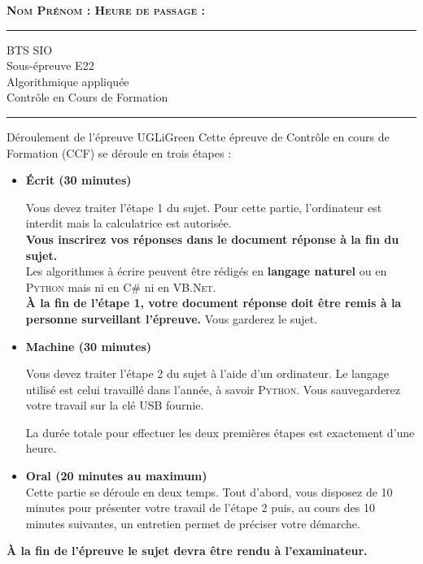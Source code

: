 \renewcommand{\question}{\addtocounter{questionnumber}{1}\subsection*{Question \thequestionnumber}}

{\large\bfseries \scshape Nom Prénom : \makebox[6cm]{\dotfill}\hfill Heure de passage : \makebox[3cm]{\dotfill}\hfill\\
\vspace{2em}
\hrule
\vspace{2mm}
\begin{center}\titlefont\Huge\color{UGLiBlue} BTS SIO\\
	Sous-épreuve E22 \\ 
    Algorithmique appliquée\\
	Contrôle en Cours de Formation\end{center}
\vspace{2mm}
\hrule}
\vspace{2em}

\begin{encadrecolore}{Déroulement de l'épreuve }{UGLiGreen}
	Cette épreuve de Contrôle en cours de Formation (CCF) se déroule en trois étapes :
\begin{itemize}
	\item \textbf{\'Ecrit (30 minutes)}\par
	Vous devez traiter l'étape 1 du sujet. Pour cette partie, l'ordinateur est interdit mais la calculatrice est autorisée.\\
    
    \textbf{Vous inscrirez vos réponses dans le document réponse à la fin du sujet.}\\
    
    Les algorithmes à écrire peuvent être rédigés en \textbf{langage naturel} ou en \textsc{Python}	mais ni en \textsc{C\#} ni en \textsc{VB.Net}.\\
    
    \textbf{À la fin de l'étape 1, votre document réponse doit être remis à la personne surveillant l'épreuve.} Vous garderez le sujet.
    \item \textbf{Machine (30 minutes)}\par
	Vous devez traiter l'étape 2 du sujet à l'aide d'un ordinateur. Le langage utilisé est celui travaillé dans l'année, à savoir \textsc{Python}.
	Vous sauvegarderez votre travail sur la clé USB fournie.\par 
	La durée totale pour effectuer les deux premières étapes est exactement d'une heure. \par
	\item \textbf{Oral (20 minutes au maximum)}\\
	Cette partie se déroule en deux temps. Tout d'abord, vous disposez de 10 minutes pour présenter votre travail de l'étape 2 puis, au cours des 10 minutes suivantes, un entretien permet de préciser votre démarche.
\end{itemize}	

\textbf{À la fin de l'épreuve le sujet devra être rendu à l'examinateur.}
\end{encadrecolore}
\newpage